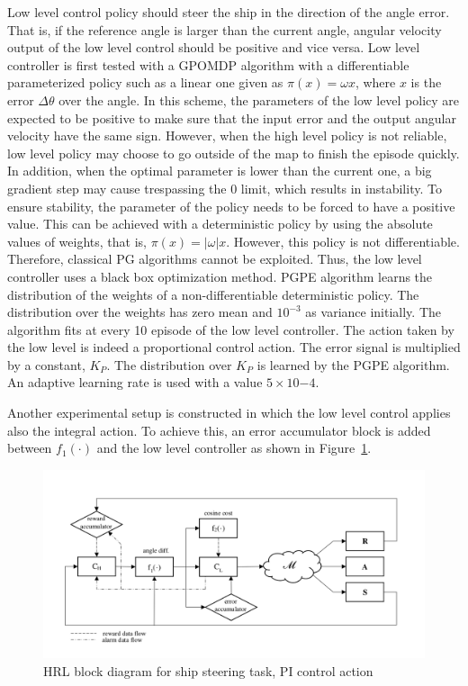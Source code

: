Low level control policy should steer the ship in the direction of the angle error. That is, if the reference angle is larger than the current angle, angular velocity output of the low level control should be positive and vice versa. Low level controller is first tested with a GPOMDP algorithm with a differentiable parameterized policy such as a linear one given as $\pi(x) = \omega x$, where $x$ is the error $\Delta\theta$ over the angle. In this scheme, the parameters of the low level policy are expected to be positive to make sure that the input error and the output angular velocity have the same sign. However, when the high level policy is not reliable, low level policy may choose to go outside of the map to finish the episode quickly. In addition, when the optimal parameter is lower than the current one, a big gradient step may cause trespassing the 0 limit, which results in instability. 
To ensure stability, the parameter of the policy needs to be forced to have a positive value. This can be achieved with a deterministic policy by using the absolute values of  weights, that is,  $\pi(x) = \left|\omega\right|x$. However, this policy is not differentiable. Therefore, classical PG algorithms cannot be exploited. Thus, the low level controller uses a black box optimization method. PGPE algorithm learns the distribution of the weights of a non-differentiable deterministic policy. The distribution over the weights has zero mean and $10^{-3}$ as variance initially. The algorithm fits at every 10 episode of the low level controller. The action taken by the low level is indeed a proportional control action. The error signal is multiplied by a constant, $K_P$. The distribution over $K_P$ is learned by the PGPE algorithm. An adaptive learning rate is used with a value $5\times10{-4}$.

Another experimental setup is constructed in which the low level control applies also the integral action. To achieve this, an error accumulator block is added between $f_1( \cdot )$ and the low level controller as shown in Figure~\ref{fig:shipsteeringpi}.

\begin{figure}[t]
      \centering
      \includegraphics[width = \textwidth]{./pictures/pishipsteering.png}
      \caption{HRL block diagram for ship steering task, PI control action}
      \label{fig:shipsteeringpi}
\end{figure}

